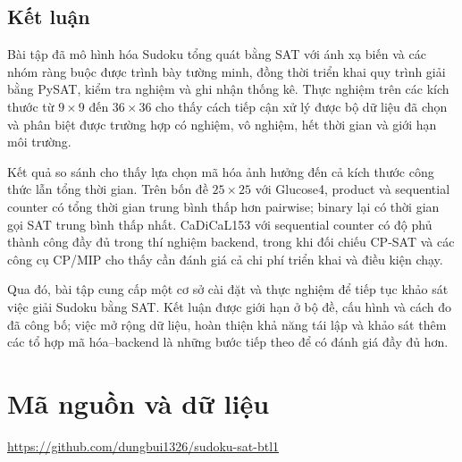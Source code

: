 \documentclass[a4paper,fleqn]{cas-sc}
\begin{document}
\subsection{Kết luận}

Bài tập đã mô hình hóa Sudoku tổng quát bằng SAT với ánh xạ biến và
các nhóm ràng buộc được trình bày tường minh, đồng thời triển khai
quy trình giải bằng PySAT, kiểm tra nghiệm và ghi nhận thống kê.
Thực nghiệm trên các kích thước từ $9\times9$ đến $36\times36$ cho
thấy cách tiếp cận xử lý được bộ dữ liệu đã chọn và phân biệt được
trường hợp có nghiệm, vô nghiệm, hết thời gian và giới hạn môi trường.

Kết quả so sánh cho thấy lựa chọn mã hóa ảnh hưởng đến cả kích thước
công thức lẫn tổng thời gian. Trên bốn đề $25\times25$ với Glucose4,
product và sequential counter có tổng thời gian trung bình thấp hơn
pairwise; binary lại có thời gian gọi SAT trung bình thấp nhất.
CaDiCaL153 với sequential counter có độ phủ thành công đầy đủ trong
thí nghiệm backend, trong khi đối chiếu CP-SAT và các công cụ CP/MIP
cho thấy cần đánh giá cả chi phí triển khai và điều kiện chạy.

Qua đó, bài tập cung cấp một cơ sở cài đặt và thực nghiệm để tiếp tục
khảo sát việc giải Sudoku bằng SAT. Kết luận được giới hạn ở bộ đề,
cấu hình và cách đo đã công bố; việc mở rộng dữ liệu, hoàn thiện khả
năng tái lập và khảo sát thêm các tổ hợp mã hóa--backend là những bước
tiếp theo để có đánh giá đầy đủ hơn.

\section*{Mã nguồn và dữ liệu}
\url{https://github.com/dungbui1326/sudoku-sat-btl1}
\end{document}
